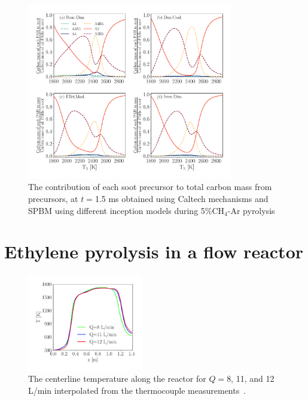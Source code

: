 \begin{figure}[H]
	\centering
	\includegraphics[width=0.8\textwidth]{Figures/Results/Shocktube/Agafonov2016_cpr/c_dist_spc.pdf}
	\caption{The contribution of each soot precursor to total carbon mass from precursors, at $t=$1.5 ms obtained using Caltech mechanisms and SPBM using different inception models during 5\%$\mathrm{CH_4}$-Ar pyrolysis}
	\label{fig:shockagof_spccont_cpr} 
\end{figure}

\section{Ethylene pyrolysis in a flow reactor}


\begin{figure}[H]
	\centering
	\includegraphics[width=0.45\textwidth]{Figures/Results/PFR/temperature_combined.pdf}
	\caption{The centerline temperature along the reactor for $Q=$8, 11, and 12 L/min interpolated from the thermocouple measurements~\citep{mei2019quantitative}.}
	\label{fig:pfr_temp} 
\end{figure}


